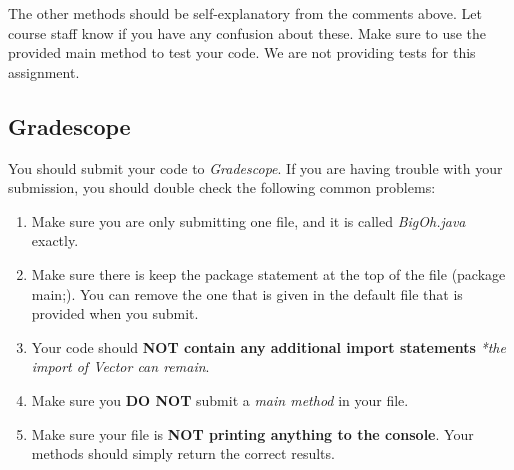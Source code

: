 \documentclass[paper=a4, fontsize=11pt, parskip=full]{scrartcl} %
\numberwithin{equation}{section} %
\numberwithin{figure}{section} %
\numberwithin{table}{section} %
\begin{document}
The other methods should be self-explanatory from the comments above. Let course staff know if you have any confusion about these. Make sure to use the provided main method to test your code. We are not providing tests for this assignment.


\subsection{Gradescope}

You should submit your code to \emph{Gradescope}. If you are having trouble with your submission, you should double check the following common problems:

\begin{enumerate}
	\item Make sure you are only submitting one file, and it is called \emph{BigOh.java} exactly.
	\item Make sure there is keep the package statement at the top of the file (package main;). You can remove the one that is given in the default file that is provided when you submit.
	\item Your code should \textbf{NOT contain any additional import statements} \emph{*the import of Vector can remain}.
	\item Make sure you \textbf{DO NOT} submit a \emph{main method} in your file.
	\item Make sure your file is \textbf{NOT printing anything to the console}. Your methods should simply return the correct results.
\end{enumerate}

\end{document}
